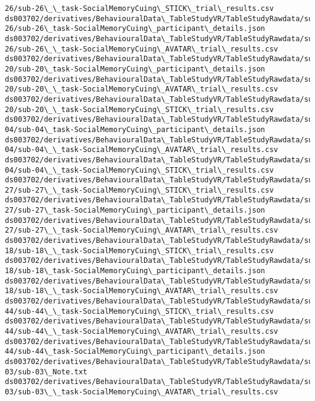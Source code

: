 \documentclass[11pt]{article}
\begin{document}
\begin{Verbatim}[commandchars=\\\{\}]
26/sub-26\_\_task-SocialMemoryCuing\_STICK\_trial\_results.csv
ds003702/derivatives/BehaviouralData\_TableStudyVR/TableStudyRawdata/sub-
26/sub-26\_task-SocialMemoryCuing\_participant\_details.json
ds003702/derivatives/BehaviouralData\_TableStudyVR/TableStudyRawdata/sub-
26/sub-26\_\_task-SocialMemoryCuing\_AVATAR\_trial\_results.csv
ds003702/derivatives/BehaviouralData\_TableStudyVR/TableStudyRawdata/sub-
20/sub-20\_task-SocialMemoryCuing\_participant\_details.json
ds003702/derivatives/BehaviouralData\_TableStudyVR/TableStudyRawdata/sub-
20/sub-20\_\_task-SocialMemoryCuing\_AVATAR\_trial\_results.csv
ds003702/derivatives/BehaviouralData\_TableStudyVR/TableStudyRawdata/sub-
20/sub-20\_\_task-SocialMemoryCuing\_STICK\_trial\_results.csv
ds003702/derivatives/BehaviouralData\_TableStudyVR/TableStudyRawdata/sub-
04/sub-04\_task-SocialMemoryCuing\_participant\_details.json
ds003702/derivatives/BehaviouralData\_TableStudyVR/TableStudyRawdata/sub-
04/sub-04\_\_task-SocialMemoryCuing\_AVATAR\_trial\_results.csv
ds003702/derivatives/BehaviouralData\_TableStudyVR/TableStudyRawdata/sub-
04/sub-04\_\_task-SocialMemoryCuing\_STICK\_trial\_results.csv
ds003702/derivatives/BehaviouralData\_TableStudyVR/TableStudyRawdata/sub-
27/sub-27\_\_task-SocialMemoryCuing\_STICK\_trial\_results.csv
ds003702/derivatives/BehaviouralData\_TableStudyVR/TableStudyRawdata/sub-
27/sub-27\_task-SocialMemoryCuing\_participant\_details.json
ds003702/derivatives/BehaviouralData\_TableStudyVR/TableStudyRawdata/sub-
27/sub-27\_\_task-SocialMemoryCuing\_AVATAR\_trial\_results.csv
ds003702/derivatives/BehaviouralData\_TableStudyVR/TableStudyRawdata/sub-
18/sub-18\_\_task-SocialMemoryCuing\_STICK\_trial\_results.csv
ds003702/derivatives/BehaviouralData\_TableStudyVR/TableStudyRawdata/sub-
18/sub-18\_task-SocialMemoryCuing\_participant\_details.json
ds003702/derivatives/BehaviouralData\_TableStudyVR/TableStudyRawdata/sub-
18/sub-18\_\_task-SocialMemoryCuing\_AVATAR\_trial\_results.csv
ds003702/derivatives/BehaviouralData\_TableStudyVR/TableStudyRawdata/sub-
44/sub-44\_\_task-SocialMemoryCuing\_STICK\_trial\_results.csv
ds003702/derivatives/BehaviouralData\_TableStudyVR/TableStudyRawdata/sub-
44/sub-44\_\_task-SocialMemoryCuing\_AVATAR\_trial\_results.csv
ds003702/derivatives/BehaviouralData\_TableStudyVR/TableStudyRawdata/sub-
44/sub-44\_task-SocialMemoryCuing\_participant\_details.json
ds003702/derivatives/BehaviouralData\_TableStudyVR/TableStudyRawdata/sub-
03/sub-03\_Note.txt
ds003702/derivatives/BehaviouralData\_TableStudyVR/TableStudyRawdata/sub-
03/sub-03\_\_task-SocialMemoryCuing\_AVATAR\_trial\_results.csv

\end{Verbatim}
\end{document}
